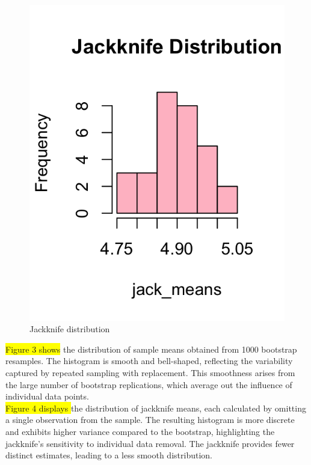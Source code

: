 \documentclass[aodsor,preprint]{imsart}
\numberwithin{equation}{section}
\theoremstyle{plain}
\begin{document}
\begin{figure}[H]
\begin{minipage}[b]{0.45\textwidth}
  \includegraphics[width=\textwidth]{Rplot03.png}
  \caption{Jackknife distribution}
  \label{fig:jackknife-dist}
\end{minipage}
\end{figure}


 \colorbox{yellow}{Figure 3 shows} the distribution of sample means obtained from 1000 bootstrap resamples. The histogram is smooth and bell-shaped, reflecting the variability captured by repeated sampling with replacement. This smoothness arises from the large number of bootstrap replications, which average out the influence of individual data points.\\

 \colorbox{yellow}{Figure 4 displays } the distribution of jackknife means, each calculated by omitting a single observation from the sample. The resulting histogram is more discrete and exhibits higher variance compared to the bootstrap, highlighting the jackknife’s sensitivity to individual data removal. The jackknife provides fewer distinct estimates, leading to a less smooth distribution.\\
\end{document}
